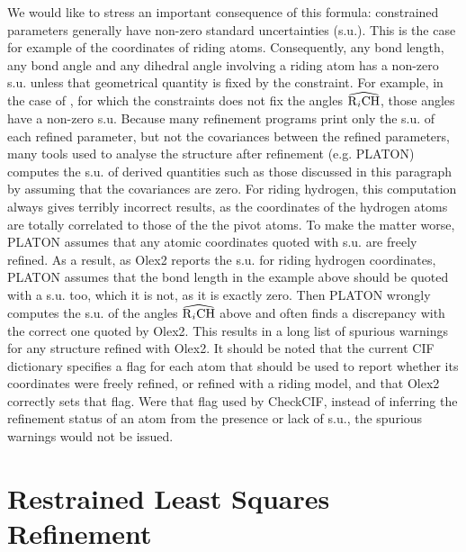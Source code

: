 \documentclass[pdf]{iucr}
\begin{document}
We would like to stress an important consequence of this formula: constrained parameters generally have non-zero standard uncertainties (s.u.). This is the case for example of the coordinates of riding atoms. Consequently, any bond length, any bond angle and any dihedral angle involving a riding atom has a non-zero s.u. unless that geometrical quantity is fixed by the constraint. For example, in the case of , for which the constraints does not fix the angles $\widehat{\ce{R$_i$CH}}$, those angles have a non-zero s.u. Because many refinement programs print only the s.u. of each refined parameter, but not the covariances between the refined parameters, many tools used to analyse the structure after refinement (e.g. PLATON) computes the s.u. of derived quantities such as those discussed in this paragraph by assuming that the covariances are zero. For riding hydrogen, this computation always gives terribly incorrect results, as the coordinates of the hydrogen atoms are totally correlated to those of the the pivot atoms. To make the matter worse, PLATON assumes that any atomic coordinates quoted with s.u. are freely refined. As a result, as Olex2 reports the s.u. for riding hydrogen coordinates, PLATON assumes that the bond length  in the example above should be quoted with a s.u. too, which it is not, as it is exactly zero. Then PLATON wrongly computes the s.u. of the angles $\widehat{\ce{R$_i$CH}}$ above and often finds a discrepancy with the correct one quoted by Olex2. This results in a long list of spurious warnings for any structure refined with Olex2. It should be noted that the current CIF dictionary specifies a flag for each atom that should be used to report whether its coordinates were freely refined, or refined with a riding model, and that Olex2 correctly sets that flag. Were that flag used by CheckCIF, instead of inferring the refinement status of an atom from the presence or lack of s.u., the spurious warnings would not be issued.


\section{Restrained Least Squares Refinement}
\label{sec:restraints}
\end{document}
